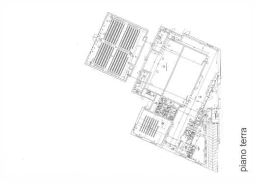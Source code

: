 \documentclass[10pt, a4paper]{book}
\begin{document}
\includegraphics[scale=0.25]{A0.pdf}
\newpage
\end{document}
